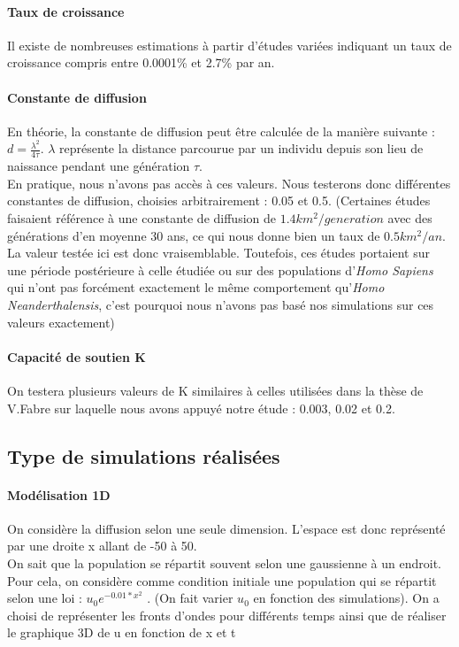 \documentclass[a4paper,11pt]{article}
\begin{document}
\paragraph{Taux de croissance} Il existe de nombreuses estimations à partir d'études variées indiquant un taux de croissance compris entre 0.0001\% et 2.7\% par an.
\paragraph{Constante de diffusion} En théorie, la constante de diffusion peut être calculée de la manière suivante : $d= \frac{\lambda ^2}{4\tau}$. $\lambda $ représente la distance parcourue par un individu depuis son lieu de naissance pendant une génération $\tau$.\\ 
En pratique, nous n'avons pas accès à ces valeurs. Nous testerons donc différentes constantes de diffusion, choisies arbitrairement : 0.05 et 0.5. (Certaines études faisaient référence à une constante de diffusion de $1.4km^2/generation$ avec des générations d'en moyenne 30 ans, ce qui nous donne bien un taux de $0.5 km^2/an$. La valeur testée ici est donc vraisemblable. Toutefois, ces études portaient sur une période postérieure à celle étudiée ou sur des populations d'\textit{Homo Sapiens} qui n'ont pas forcément exactement le même comportement qu'\textit{Homo Neanderthalensis}, c'est pourquoi nous n'avons pas basé nos simulations sur ces valeurs exactement)
\paragraph{Capacité de soutien K} On testera plusieurs valeurs de K similaires à celles utilisées dans la thèse de V.Fabre sur laquelle nous avons appuyé notre étude : 0.003, 0.02 et 0.2. %
\subsection{Type de simulations réalisées}
\paragraph{Modélisation 1D}
On considère la diffusion selon une seule dimension. L'espace est donc représenté par une droite x allant de -50 à 50.\\
On sait que la population se répartit souvent selon une gaussienne à un endroit. Pour cela, on considère comme condition initiale une population qui se répartit selon une loi :  $u_0 e^{-0.01*x^2}$ . (On fait varier $u_0$ en fonction des simulations).
On a choisi  de représenter les fronts d'ondes pour différents temps ainsi que de réaliser le graphique 3D de u en fonction de x et t
\end{document}
